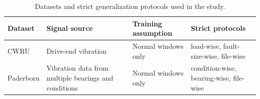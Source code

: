\begin{table}[t]
\centering
\caption{Datasets and strict generalization protocols used in the study.}
\label{tab:dataset_protocols}
\small
\setlength{\tabcolsep}{5pt}
\renewcommand{\arraystretch}{1.12}
\begin{tabularx}{\textwidth}{>{\raggedright\arraybackslash}p{2.0cm}
>{\raggedright\arraybackslash}X
>{\raggedright\arraybackslash}p{3.0cm}
>{\raggedright\arraybackslash}p{4.0cm}}
\toprule
Dataset & Signal source & Training assumption & Strict protocols \\
\midrule
CWRU & Drive-end vibration & Normal windows only & load-wise, fault-size-wise, file-wise \\
Paderborn & Vibration data from multiple bearings and conditions & Normal windows only & condition-wise, bearing-wise, file-wise \\
\bottomrule
\end{tabularx}
\end{table}
